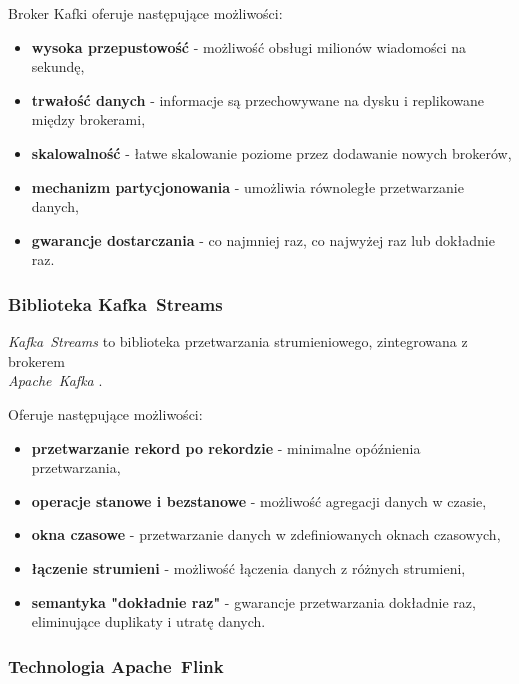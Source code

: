\vspace{0.3em}

Broker Kafki oferuje następujące możliwości:

\begin{itemize}
    \item \textbf{wysoka przepustowość} - możliwość obsługi milionów wiadomości na sekundę,
    \item \textbf{trwałość danych} - informacje są przechowywane na dysku i replikowane między brokerami,
    \item \textbf{skalowalność} - łatwe skalowanie poziome przez dodawanie nowych brokerów,
    \item \textbf{mechanizm partycjonowania} - umożliwia równoległe przetwarzanie danych,
    \item \textbf{gwarancje dostarczania} - co najmniej raz, co najwyżej raz lub dokładnie raz.
\end{itemize}

\subsubsection{Biblioteka \mbox{Kafka Streams}}
\label{subsubsec:kafka_streams}

\mbox{\textit{Kafka Streams}} to biblioteka przetwarzania strumieniowego, zintegrowana z brokerem \\ \mbox{\textit{Apache Kafka}} \cite{kafka_streams}. 

\vspace{0.3em}

Oferuje następujące możliwości:

\begin{itemize}
    \item \textbf{przetwarzanie rekord po rekordzie} - minimalne opóźnienia przetwarzania,
    \item \textbf{operacje stanowe i bezstanowe} - możliwość agregacji danych w czasie,
    \item \textbf{okna czasowe} - przetwarzanie danych w zdefiniowanych oknach czasowych,
    \item \textbf{łączenie strumieni} - możliwość łączenia danych z różnych strumieni,
    \item \textbf{semantyka "dokładnie raz"} - gwarancje przetwarzania dokładnie raz, eliminujące duplikaty i utratę danych.
\end{itemize}

\subsubsection{Technologia \mbox{Apache Flink}}
\label{subsubsec:apache_flink}

